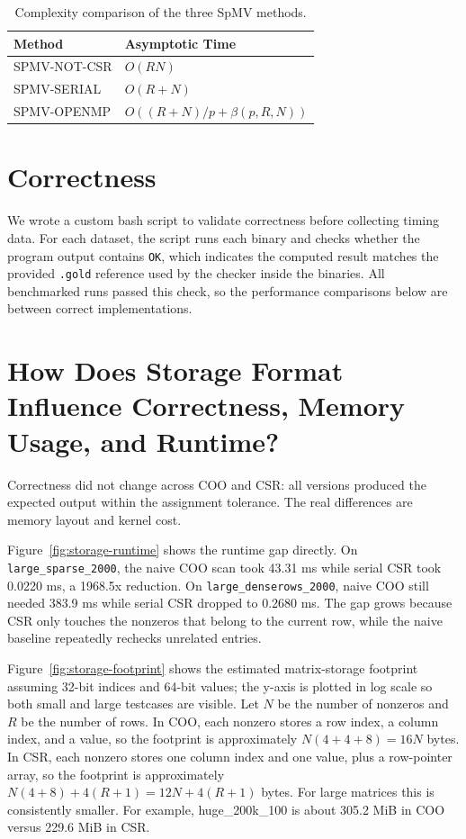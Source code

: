 \documentclass{article}
\begin{document}
\begin{table}[h]
  \centering
  \begin{tabular}{ll}
    \toprule
    Method & Asymptotic Time \\
    \midrule
    SPMV-NOT-CSR & $O(RN)$ \\
    SPMV-SERIAL & $O(R+N)$ \\
    SPMV-OPENMP & $O((R+N)/p + \beta(p, R, N))$ \\
    \bottomrule
  \end{tabular}
  \caption{Complexity comparison of the three SpMV methods.}
  \label{tab:complexity-summary}
\end{table}

\section{Correctness}

We wrote a custom bash script to validate correctness before collecting timing data. For each dataset, the script runs each binary and checks whether the program output contains \texttt{OK}, which indicates the computed result matches the provided \texttt{.gold} reference used by the checker inside the binaries. All benchmarked runs passed this check, so the performance comparisons below are between correct implementations.

\section{How Does Storage Format Influence Correctness, Memory Usage, and Runtime?}

Correctness did not change across COO and CSR: all versions produced the expected output within the assignment tolerance. The real differences are memory layout and kernel cost.

Figure~\ref{fig:storage-runtime} shows the runtime gap directly. On \texttt{large\_sparse\_2000}, the naive COO scan took 43.31 ms while serial CSR took 0.0220 ms, a 1968.5x reduction. On \texttt{large\_denserows\_2000}, naive COO still needed 383.9 ms while serial CSR dropped to 0.2680 ms. The gap grows because CSR only touches the nonzeros that belong to the current row, while the naive baseline repeatedly rechecks unrelated entries.

Figure~\ref{fig:storage-footprint} shows the estimated matrix-storage footprint assuming 32-bit indices and 64-bit values; the y-axis is plotted in log scale so both small and large testcases are visible. Let $N$ be the number of nonzeros and $R$ be the number of rows. In COO, each nonzero stores a row index, a column index, and a value, so the footprint is approximately $N(4+4+8)=16N$ bytes. In CSR, each nonzero stores one column index and one value, plus a row-pointer array, so the footprint is approximately $N(4+8)+4(R+1)=12N+4(R+1)$ bytes. For large matrices this is consistently smaller. For example, huge\_200k\_100 is about 305.2 MiB in COO versus 229.6 MiB in CSR.
\end{document}
